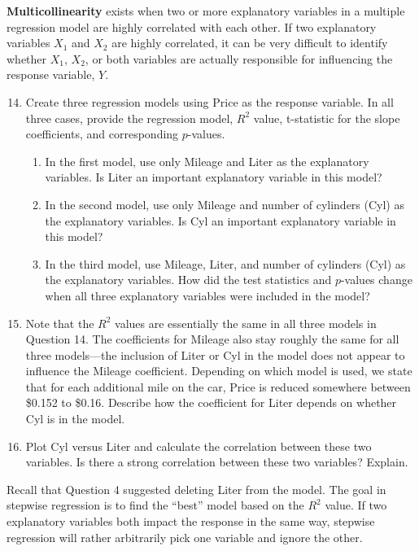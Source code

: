 \documentclass[
]{report}
\begin{document}
\textbf{Multicollinearity} exists when two or more explanatory variables in a multiple regression model are highly correlated with each other. If two explanatory variables \(\scriptstyle X_1\) and \(\scriptstyle X_2\) are highly correlated, it can be very difficult to identify whether \(\scriptstyle X_1\), \(\scriptstyle X_2\), or both variables are actually responsible for influencing the response variable, \(\scriptstyle Y\).

\begin{enumerate}
 \setcounter{enumi}{13}
 \item Create three regression models using Price as the response variable. In all three cases, provide the regression model, $\scriptstyle {R}^2$ value, t-statistic for the slope coefficients, and corresponding $\scriptstyle p$-values.

\begin{enumerate}
  \item In the first model, use only Mileage and Liter as the explanatory variables. Is Liter an important explanatory variable in this model?
 \item  In the second model, use only Mileage and number of cylinders (Cyl) as the explanatory variables. Is Cyl an important explanatory variable in this model?
 \item In the third model, use Mileage, Liter, and number of cylinders (Cyl) as the explanatory variables. How did the test statistics and $\scriptstyle p$-values change when all three explanatory variables were included in the model?
\end{enumerate}
\item  Note that the $\scriptstyle {R}^2$ values are essentially the same in all three models in Question 14. The coefficients for Mileage also stay roughly the same for all three models—the inclusion of Liter or Cyl in the model does not appear to influence the Mileage coefficient. Depending on which model is used, we state that for each additional mile on the car, Price is reduced somewhere between \$0.152 to \$0.16. Describe how the coefficient for Liter depends on whether Cyl is in the model.

\item  Plot Cyl versus Liter and calculate the correlation between these two variables. Is there a strong correlation between these two variables? Explain.
\end{enumerate}

Recall that Question 4 suggested deleting Liter from the model. The goal in stepwise regression is to find the ``best'' model based on the \(\scriptstyle {R}^2\) value. If two explanatory variables both impact the response in the same way, stepwise regression will rather arbitrarily pick one variable and ignore the other.
\end{document}
